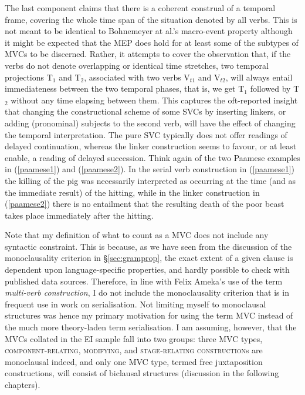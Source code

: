The last component claims that there is a coherent construal of a temporal frame, covering the whole time span of the situation denoted by all verbs. This is not meant to be identical to Bohnemeyer at al.'s macro-event property although it might be expected that the MEP does hold for at least some of the subtypes of MVCs to be discerned. Rather, it attempts to cover the observation that, if the verbs do not denote overlapping or identical time stretches, two temporal projections T$_1$ and T$_2$, associated with two verbs V$_{t1}$ and V$_{t2}$, will always entail immediateness between the two temporal phases, that is, we get T$_1$ followed by T$_2$ without any time elapsing between them. This captures the oft-reported insight that changing the constructional scheme of some SVCs by inserting linkers, or adding (pronominal) subjects to the second verb, will have the effect of changing the temporal interpretation. The pure SVC typically does not offer readings of delayed continuation, whereas the linker construction seems to favour, or at least enable, a reading of delayed succession. Think again of the two Paamese examples in (\ref{paamese1}) and (\ref{paamese2}). In the serial verb construction in (\ref{paamese1}) the killing of the pig was necessarily interpreted as occurring at the time (and as the immediate result) of the hitting, while in the linker construction in (\ref{paamese2}) there is no entailment that the resulting death of the poor beast takes place immediately after the hitting.

Note that my definition of what to count as a MVC does not include any syntactic constraint. This is because, as we have seen from the discussion of the monoclausality criterion in §\ref{sec:gramprop}, the exact extent of a given clause is dependent upon language-specific properties, and hardly possible to check with published data sources. Therefore, in line with Felix Ameka's use of the term \textit{multi-verb construction}, I do not include the monoclausality criterion that is in frequent use in work on serialisation. Not limiting myself to monoclausal structures was hence my primary motivation for using the term MVC instead of the much more theory-laden term serialisation. I am assuming, however, that the MVCs collated in the EI sample fall into two groups: three MVC types, \textsc{component-relating}, \textsc{modifying}, and \textsc{stage-relating construction}s are monoclausal indeed, and only one MVC type, termed free juxtaposition constructions, will consist of biclausal structures (discussion in the following chapters). 

